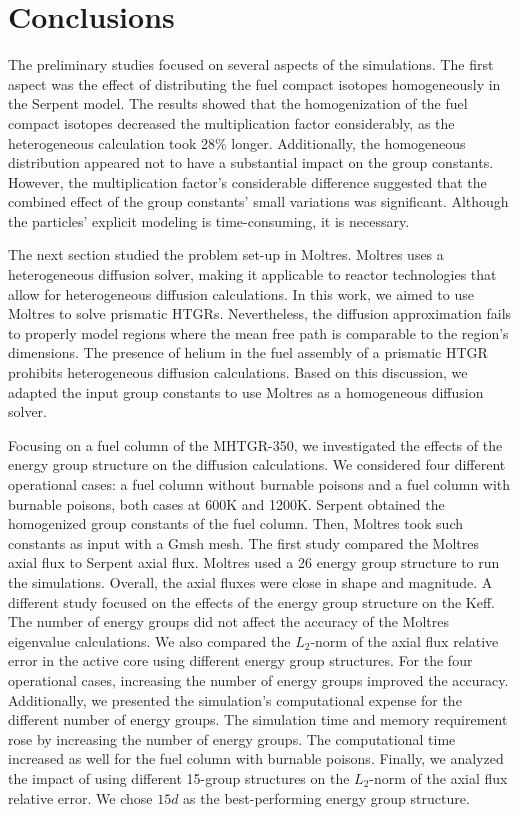 \section{Conclusions}
\label{sec:neutr-conc}

The preliminary studies focused on several aspects of the simulations.
The first aspect was the effect of distributing the fuel compact isotopes homogeneously in the Serpent model.
The results showed that the homogenization of the fuel compact isotopes decreased the multiplication factor considerably, as the heterogeneous calculation took 28$\%$ longer.
Additionally, the homogeneous distribution appeared not to have a substantial impact on the group constants.
However, the multiplication factor's considerable difference suggested that the combined effect of the group constants’ small variations was significant.
Although the particles’ explicit modeling is time-consuming, it is necessary.

The next section studied the problem set-up in Moltres.
Moltres uses a heterogeneous diffusion solver, making it applicable to reactor technologies that allow for heterogeneous diffusion calculations.
In this work, we aimed to use Moltres to solve prismatic HTGRs.
Nevertheless, the diffusion approximation fails to properly model regions where the mean free path is comparable to the region's dimensions.
The presence of helium in the fuel assembly of a prismatic \gls{HTGR} prohibits heterogeneous diffusion calculations.
Based on this discussion, we adapted the input group constants to use Moltres as a homogeneous diffusion solver.

Focusing on a fuel column of the MHTGR-350, we investigated the effects of the energy group structure on the diffusion calculations.
We considered four different operational cases: a fuel column without burnable poisons and a fuel column with burnable poisons, both cases at 600K and 1200K.
Serpent obtained the homogenized group constants of the fuel column.
Then, Moltres took such constants as input with a Gmsh mesh.
The first study compared the Moltres axial flux to Serpent axial flux.
Moltres used a 26 energy group structure to run the simulations.
Overall, the axial fluxes were close in shape and magnitude.
A different study focused on the effects of the energy group structure on the \gls{Keff}.
The number of energy groups did not affect the accuracy of the Moltres eigenvalue calculations.
We also compared the $L_2$-norm of the axial flux relative error in the active core using different energy group structures.
For the four operational cases, increasing the number of energy groups improved the accuracy.
Additionally, we presented the simulation's computational expense for the different number of energy groups.
The simulation time and memory requirement rose by increasing the number of energy groups.
The computational time increased as well for the fuel column with burnable poisons.
Finally, we analyzed the impact of using different 15-group structures on the $L_2$-norm of the axial flux relative error.
We chose $15d$ as the best-performing energy group structure.

